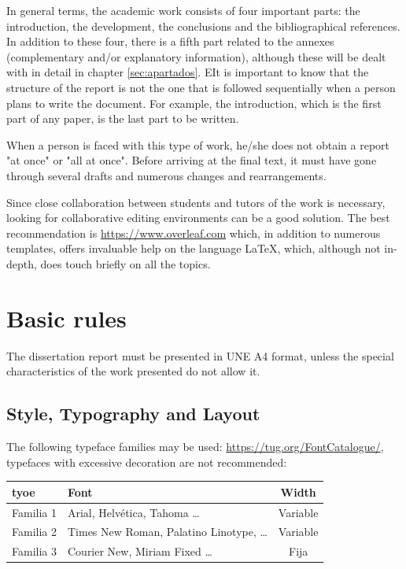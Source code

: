 In general terms, the academic work consists of four important parts: the introduction, the development, the conclusions and the bibliographical references. In addition to these four, there is a fifth part related to the annexes (complementary and/or explanatory information), although these will be dealt with in detail in chapter \ref{sec:apartados}.  EIt is important to know that the structure of the report is not the one that is followed sequentially when a person plans to write the document. For example, the introduction, which is the first part of any paper, is the last part to be written.

When a person is faced with this type of work, he/she does not obtain a report "at once" or "all at once". Before arriving at the final text, it must have gone through several drafts and numerous changes and rearrangements.

Since close collaboration between students and tutors of the work is necessary, looking for collaborative editing environments can be a good solution. The best recommendation is  \url{https://www.overleaf.com} which, in addition to numerous templates, offers invaluable help on the language \LaTeX{}, which, although not in-depth, does touch briefly on all the topics.

\chapter{Basic rules} 
\label{sec:funda}

The dissertation report must be presented in UNE A4 format, unless the special characteristics of the work presented do not allow it.

\section {Style, Typography and Layout}

The following typeface families may be used: \url{https://tug.org/FontCatalogue/}, typefaces with excessive decoration are not recommended:

	\begin{center}
	\begin{tabular}{p{2cm}p{7.5cm}c}
		\textbf{tyoe} & \textbf{Font} & \textbf{Width} \\ \hline
         Familia 1 & Arial, Helvética, Tahoma  	\ldots & Variable \\
         Familia 2 & Times New Roman, Palatino  Linotype,  	\ldots & Variable  \\
         Familia 3 & Courier  New,  Miriam Fixed \ldots & Fija\\
         \hline
	\end{tabular}
	\end{center}



